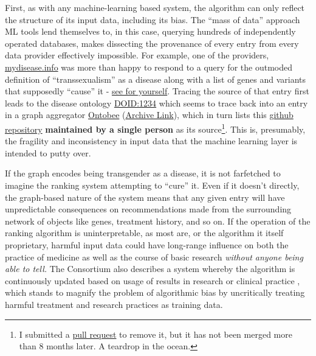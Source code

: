 First, as with any machine-learning based system, the algorithm can only
reflect the structure of its input data, including its bias. The ``mass
of data'' approach ML tools lend themselves to, in this case, querying
hundreds of independently operated databases, makes dissecting the
provenance of every entry from every data provider effectively
impossible. For example, one of the providers,
\href{https://mydisease.info}{mydisease.info} was more than happy to
respond to a query for the outmoded definition of ``transsexualism'' as
a disease \citep{ramTransphobiaEncodedExamination2021}  along with
a list of genes and variants that supposedly ``cause'' it -
\href{http://mydisease.info/v1/query?q=\%22DOID\%3A10919\%22}{see for
yourself}. Tracing the source of that entry first leads to the disease
ontology
\href{https://web.archive.org/web/20211007053446/https://www.ebi.ac.uk/ols/ontologies/doid/terms?iri=http\%3A\%2F\%2Fpurl.obolibrary.org\%2Fobo\%2FDOID_1234}{DOID:1234}
which seems to trace back into an entry in a graph aggregator
\href{http://www.ontobee.org/ontology/DOID?iri=http://purl.obolibrary.org/obo/DOID_1234}{Ontobee}
(\href{https://web.archive.org/web/20210923110103/http://www.ontobee.org/ontology/DOID?iri=http://purl.obolibrary.org/obo/DOID_1234}{Archive
Link}), which in turn lists this
\href{https://github.com/jannahastings/mental-functioning-ontology}{github
repository} \textbf{maintained by a single person} as its
source\footnote{I submitted a
  \href{https://github.com/jannahastings/mental-functioning-ontology/pull/8}{pull
  request} to remove it, but it has not been merged more than 8 months
  later. A teardrop in the ocean.}. This is, presumably, the fragility
and inconsistency in input data that the machine learning layer is
intended to putty over.

If the graph encodes being transgender as a disease, it is not
farfetched to imagine the ranking system attempting to ``cure'' it. Even
if it doesn't directly, the graph-based nature of the system means that
any given entry will have unpredictable consequences on recommendations
made from the surrounding network of objects like genes, treatment
history, and so on. If the operation of the ranking algorithm is
uninterpretable, as most are, or the algorithm it itself proprietary,
harmful input data could have long-range influence on both the practice
of medicine as well as the course of basic research \emph{without anyone
being able to tell.} The Consortium also describes a system whereby the
algorithm is continuously updated based on usage of results in research
or clinical practice \citep{consortiumUniversalBiomedicalData2019} , which stands to magnify the problem of algorithmic bias by
uncritically treating harmful treatment and research practices as
training data.


